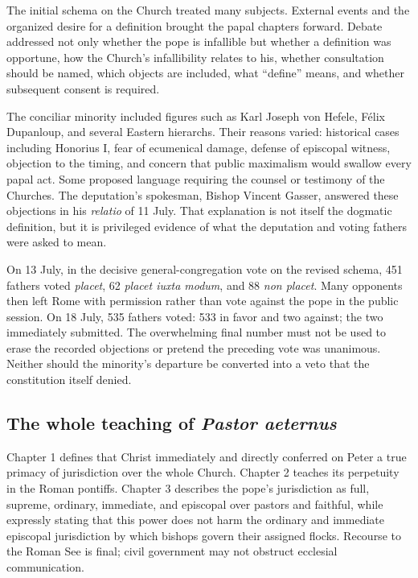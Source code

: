 The initial schema on the Church treated many subjects. External events and the organized desire for a definition brought the papal chapters forward. Debate addressed not only whether the pope is infallible but whether a definition was opportune, how the Church's infallibility relates to his, whether consultation should be named, which objects are included, what “define” means, and whether subsequent consent is required.

The conciliar minority included figures such as Karl Joseph von Hefele, Félix Dupanloup, and several Eastern hierarchs. Their reasons varied: historical cases including Honorius I, fear of ecumenical damage, defense of episcopal witness, objection to the timing, and concern that public maximalism would swallow every papal act. Some proposed language requiring the counsel or testimony of the Churches. The deputation's spokesman, Bishop Vincent Gasser, answered these objections in his \emph{relatio} of 11 July. That explanation is not itself the dogmatic definition, but it is privileged evidence of what the deputation and voting fathers were asked to mean.

On 13 July, in the decisive general-congregation vote on the revised schema, 451 fathers voted \emph{placet}, 62 \emph{placet iuxta modum}, and 88 \emph{non placet}. Many opponents then left Rome with permission rather than vote against the pope in the public session. On 18 July, 535 fathers voted: 533 in favor and two against; the two immediately submitted. The overwhelming final number must not be used to erase the recorded objections or pretend the preceding vote was unanimous. Neither should the minority's departure be converted into a veto that the constitution itself denied.

\subsection{The whole teaching of \emph{Pastor aeternus}}

Chapter 1 defines that Christ immediately and directly conferred on Peter a true primacy of jurisdiction over the whole Church. Chapter 2 teaches its perpetuity in the Roman pontiffs. Chapter 3 describes the pope's jurisdiction as full, supreme, ordinary, immediate, and episcopal over pastors and faithful, while expressly stating that this power does not harm the ordinary and immediate episcopal jurisdiction by which bishops govern their assigned flocks. Recourse to the Roman See is final; civil government may not obstruct ecclesial communication.

